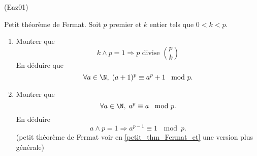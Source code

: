 \begin{tiny}(Eaz01)\end{tiny} Petit th{\'e}or{\`e}me de Fermat. \label{petit_thm_Fermat}\newline
Soit $p$ premier et $k$ entier tels que $0 < k < p$.
  \begin{enumerate}
    \item  Montrer que
\begin{displaymath}
  k \wedge p = 1 \Rightarrow p \text{ divise } \binom{p}{k}
\end{displaymath}
En d{\'e}duire que
\[
 \forall a \in \N, \; (a + 1)^{p}\equiv a^{p}+1\, \mod p.
\]

    \item  Montrer que 
\[
 \forall a \in \N, \; a^{p} \equiv a\, \mod p.
\]
En d{\'e}duire 
\begin{displaymath}
  a \wedge p = 1 \Rightarrow a^{p-1}\equiv 1\, \mod p.
\end{displaymath}
(petit théorème de Fermat voir en \ref{petit_thm_Fermat_et} une version plus générale)
  \end{enumerate}